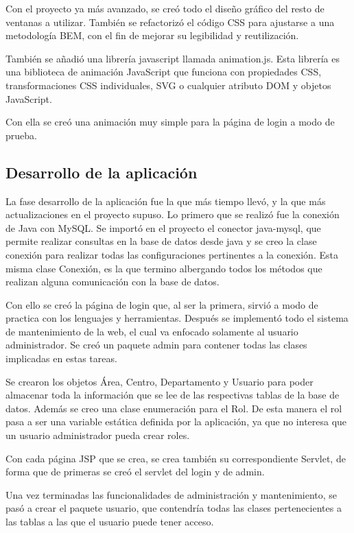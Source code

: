 Con el proyecto ya más avanzado, se creó todo el diseño gráfico del resto de ventanas a utilizar. También se refactorizó el código CSS para ajustarse a una metodología BEM, con el fin de mejorar su legibilidad y reutilización.

También se añadió una librería javascript llamada animation.js. Esta librería es una biblioteca de animación JavaScript que funciona con propiedades CSS, transformaciones CSS individuales, SVG o cualquier atributo DOM y objetos JavaScript.

Con ella se creó una animación muy simple para la página de login a modo de prueba.


\subsection{Desarrollo de la aplicación}

La fase desarrollo de la aplicación fue la que más tiempo llevó, y la que más actualizaciones en el proyecto supuso. Lo primero que se realizó fue la conexión de Java con MySQL. Se importó en el proyecto el conector java-mysql, que permite realizar consultas en la base de datos desde java y se creo la clase conexión para realizar todas las configuraciones pertinentes a la conexión. Esta misma clase Conexión, es la que termino albergando todos los métodos  que realizan alguna comunicación con la base de datos.

Con ello se creó la página de login que, al ser la primera, sirvió a modo de practica con los lenguajes y herramientas. Después se implementó todo el sistema de mantenimiento de la web, el cual va enfocado solamente al usuario administrador. Se creó un paquete admin para contener todas las clases implicadas en estas tareas. 

Se crearon los objetos Área, Centro, Departamento y Usuario para poder almacenar toda la información que se lee de las respectivas tablas de la base de datos. Además se creo una clase enumeración para el Rol. De esta manera el rol pasa a ser una variable estática definida por la aplicación, ya que no interesa que un usuario administrador pueda crear roles.

Con cada página JSP que se crea, se crea también su correspondiente Servlet, de forma que de primeras se creó el servlet del login y de admin.

Una vez terminadas las funcionalidades de administración y mantenimiento,  se pasó a crear el paquete usuario, que contendría todas las clases pertenecientes a las tablas a las que el usuario puede tener acceso.

